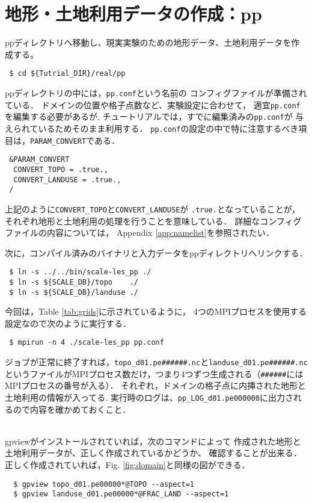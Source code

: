 
\section{地形・土地利用データの作成：pp}

ppディレクトリへ移動し、現実実験のための地形データ、土地利用データを作成する。
\begin{verbatim}
 $ cd ${Tutrial_DIR}/real/pp
\end{verbatim}
ppディレクトリの中には，\verb|pp.conf|という名前の
コンフィグファイルが準備されている．
ドメインの位置や格子点数など、実験設定に合わせて，
適宜\verb|pp.conf|を編集する必要があるが,
チュートリアルでは，すでに編集済みの\verb|pp.conf|が
与えられているためそのまま利用する．
\verb|pp.conf|の設定の中で特に注意するべき項目は，\verb|PARAM_CONVERT|である．
\begin{verbatim}
 &PARAM_CONVERT
  CONVERT_TOPO = .true.,
  CONVERT_LANDUSE = .true.,
 /
\end{verbatim}
上記のように\verb|CONVERT_TOPO|と\verb|CONVERT_LANDUSE|が
\verb|.true.|となっていることが，
それぞれ地形と土地利用の処理を行うことを意味している．
詳細なコンフィグファイルの内容については，
Appendix \ref{app:namelist}を参照されたい．

次に，コンパイル済みのバイナリと入力データをppディレクトリへリンクする．
\begin{verbatim}
 $ ln -s ../../bin/scale-les_pp ./
 $ ln -s ${SCALE_DB}/topo    ./
 $ ln -s ${SCALE_DB}/landuse ./
\end{verbatim}
今回は，Table \ref{tab:grids}に示されているように，
4つのMPIプロセスを使用する設定なので次のように実行する．
\begin{verbatim}
 $ mpirun -n 4 ./scale-les_pp pp.conf
\end{verbatim}
ジョブが正常に終了すれば，\verb|topo_d01.pe######.nc|と\verb|landuse_d01.pe######.nc|というファイルがMPIプロセス数だけ，つまり4つずつ生成される（\verb|######|にはMPIプロセスの番号が入る）．
それぞれ，ドメインの格子点に内挿された地形と土地利用の情報が入ってる.
実行時のログは、\verb|pp_LOG_d01.pe000000|に出力されるので内容を確かめておくこと．



\vspace{1cm}
\\
gpviewがインストールされていれば，次のコマンドによって
作成された地形と土地利用データが、正しく作成されているかどうか、
確認することが出来る．正しく作成されていれば，Fig. \ref{fig:domain}と同様の図ができる．
\begin{verbatim}
  $ gpview topo_d01.pe00000*@TOPO --aspect=1
  $ gpview landuse_d01.pe00000*@FRAC_LAND --aspect=1
\end{verbatim}

